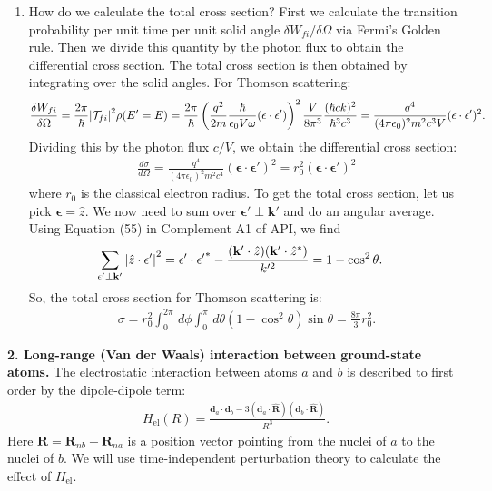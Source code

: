 \documentclass{article}
\theoremstyle{definition}
\newcommand{\f}[2]{\frac{#1}{#2}}
\newcommand{\lp}{\left(}
\newcommand{\rp}{\right)}
\begin{document}
\begin{enumerate}[label=(\alph*)]
\item How do we calculate the total cross section? First we calculate the transition probability per unit time per unit solid angle $\delta W_{fi} / \delta \Omega$ via Fermi's Golden rule. Then we divide this quantity by the photon flux to obtain the differential cross section. The total cross section is then obtained by integrating over the solid angles. For Thomson scattering: 
\begin{align*} 
\f{\delta W_{fi}}{\delta \Omega} = \f{2\pi}{\hbar }  \abs{\mathcal{T}_{fi}}^2 \rho(E' = E) 
= \f{2\pi}{\hbar}
\lp \f{q^2}{2m} \f{\hbar }{\epsilon_0 V \omega}(\mathbf{\epsilon} \cdot \mathbf{\epsilon'})\rp^2 
 \f{V}{8\pi^3} \f{(\hbar c k)^2}{\hbar^3 c^3} = 
 \f{q^4}{(4\pi\epsilon_0)^2m^2 c^3 V} (\mathbf{\epsilon}\cdot \mathbf{\epsilon'})^2.
\end{align*}
Dividing this by the photon flux $c/V$, we obtain the differential cross section:
\begin{align*}
\f{d \sigma}{ d \Omega} = 
 \f{q^4}{(4\pi\epsilon_0)^2m^2 c^4} (\mathbf{\epsilon}\cdot \mathbf{\epsilon'})^2 = r_0^2  (\mathbf{\epsilon}\cdot \mathbf{\epsilon'})^2 
\end{align*}
where $r_0$ is the classical electron radius. To get the total cross section, let us pick $\mathbf{\epsilon} = \hat{z}$. We now need to sum over $\mathbf{\epsilon'} \perp \mathbf{k'}$ and do an angular average. Using Equation (55) in Complement A1 of API, we find 
\begin{align*}
\sum_{\mathbf{\epsilon'}\perp \mathbf{k'}} \abs{ \hat{z}\cdot \mathbf{\epsilon'} }^2
&= \mathbf{\epsilon'} \cdot \mathbf{\epsilon'}^* - \f{(  \mathbf{k'}\cdot \hat{z} )( \mathbf{k'}\cdot \hat{z}^* )}{k'^2} = 1-\cos^2\theta.
\end{align*}
So, the total cross section for Thomson scattering is:
\begin{align*}
\sigma = r_0^2 \int_0^{2\pi}\,d\phi \int_0^\pi \,d\theta  (1-\cos^2 \theta)\sin\theta  = \f{8\pi}{3}r_0^2. 
\end{align*}


\end{enumerate}




\noindent \textbf{2. Long-range (Van der Waals) interaction between ground-state atoms.} The electrostatic interaction between atoms $a$ and $b$ is described to first order by the dipole-dipole term:
\begin{align*}
H_\text{el}(R) = \f{ \mathbf{d}_a \cdot \mathbf{d}_b - 3 (\mathbf{d}_a \cdot \hat{\mathbf{R}})(\mathbf{d}_b \cdot \hat{\mathbf{R}})  }{R^3}.
\end{align*}
Here $\mathbf{R} = \mathbf{R}_{nb} - \mathbf{R}_{na}$ is a position vector pointing from the nuclei of $a$ to the nuclei of $b$. We will use time-independent perturbation theory to calculate the effect of $H_\text{el}$. 
\end{document}
